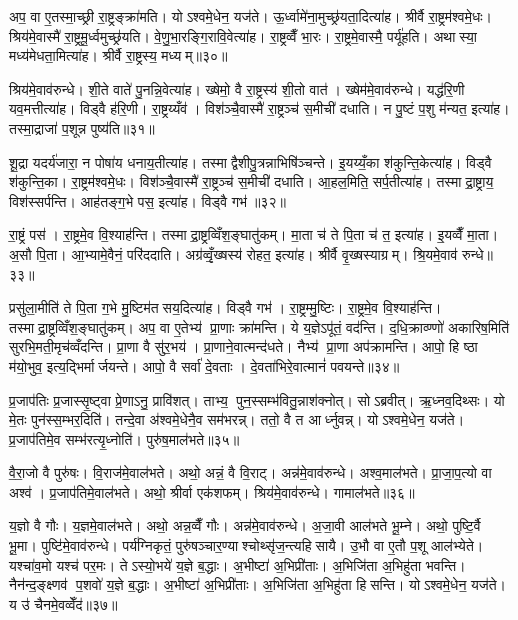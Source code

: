 अप॒ वा ए॒तस्मा॒च्छ्री रा॒ष्ट्रङ्क्रा॑मति। योऽश्वमे॒धेन॒ यज॑ते। ऊ॒र्ध्वामे॑ना॒मुच्छ्र॑यता॒दित्या॑ह। श्रीर्वै रा॒ष्ट्रम॑श्वमे॒धः। श्रिय॑मे॒वास्मै॑ रा॒ष्ट्रमू॒र्ध्वमुच्छ्र॑यति। वे॒णु॒भा॒रङ्गि॒रावि॒वेत्या॑ह। रा॒ष्ट्रव्वैँ भा॒रः। रा॒ष्ट्रमे॒वास्मै॒ पर्यू॑हति। अथास्या॒ मध्य॑मेधता॒मित्या॑ह। श्रीर्वै रा॒ष्ट्रस्य॒ मध्यम्॥३०॥

श्रिय॑मे॒वाव॑रुन्धे। शी॒ते वाते॑ पु॒नन्नि॒वेत्या॑ह। ख्षेमो॒ वै रा॒ष्ट्रस्य॑ शी॒तो वात॑। ख्षेम॑मे॒वाव॑रुन्धे। यद्ध॑रि॒णी यव॒मत्तीत्या॑ह। विड्वै ह॑रि॒णी। रा॒ष्ट्रय्यँव॑। विश॑ञ्चै॒वास्मै॑ रा॒ष्ट्रञ्च॑ स॒मीची॑ दधाति। न पु॒ष्टं प॒शु म॑न्यत॒ इत्या॑ह। तस्मा॒द्राजा॑ प॒शून्न पुष्य॑ति॥३१॥

शू॒द्रा यदर्य॑जारा॒ न पोषा॑य धनाय॒तीत्या॑ह। तस्माद्वैशीपु॒त्रन्नाभिषि॑ञ्चन्ते। इ॒यय्यँ॒का श॑कुन्ति॒केत्या॑ह। विड्वै श॑कुन्ति॒का। रा॒ष्ट्रम॑श्वमे॒धः। विश॑ञ्चै॒वास्मै॑ रा॒ष्ट्रञ्च॑ स॒मीची॑ दधाति। आ॒हल॒मिति॒ सर्प॒तीत्या॑ह। तस्माद्रा॒ष्ट्राय॒ विश॑स्सर्पन्ति। आह॑तङ्ग॒भे पस॒ इत्या॑ह। विड्वै गभ॑॥३२॥

रा॒ष्ट्रं पस॑। रा॒ष्ट्रमे॒व वि॒श्याह॑न्ति। तस्माद्रा॒ष्ट्रव्विँश॒ङ्घातु॑कम्। मा॒ता च॑ ते पि॒ता च॑ त॒ इत्या॑ह। इ॒यव्वैँ मा॒ता। अ॒सौ पि॒ता। आ॒भ्यामे॒वैनं॒ परि॑ददाति। अग्र॑व्वृँ॒ख्षस्य॑ रोहत॒ इत्या॑ह। श्रीर्वै वृ॒ख्षस्याग्रम्। श्रि॒यमे॒वाव॑ रुन्धे॥३३॥

प्रसु॑ला॒मीति॑ ते पि॒ता ग॒भे मु॒ष्टिम॑तसय॒दित्या॑ह। विड्वै गभ॑। रा॒ष्ट्रम्मु॒ष्टिः। रा॒ष्ट्रमे॒व वि॒श्याह॑न्ति। तस्माद्रा॒ष्ट्रव्विँश॒ङ्घातु॑कम्। अप॒ वा ए॒तेभ्य॑ प्रा॒णाः क्रा॑मन्ति। ये य॒ज्ञेऽपू॑तं॒ वद॑न्ति। द॒धि॒क्राव्ण्णो॑ अकारिष॒मिति॑ सुरभि॒मती॒मृच॑व्वँदन्ति। प्रा॒णा वै सु॑र॒भय॑। प्रा॒णाने॒वात्मन्द॑धते। नैभ्य॑ प्रा॒णा अप॑क्रामन्ति। आपो॒ हि ष्ठा म॑यो॒भुव॒ इत्य॒द्भिर्मार्जयन्ते। आपो॒ वै सर्वा॑ दे॒वताः। दे॒वता॑भिरे॒वात्मानं॑ पवयन्ते॥३४॥\anuvakamend[रा॒ष्ट्रस्य॒ मध्यं॒ पुष्य॑ति॒ गभो॑ रुन्धे दधते च॒त्वारि॑ च]

प्र॒जाप॑तिः प्र॒जास्सृ॒ष्ट्वा प्रे॒णाऽनु॒ प्रावि॑शत्। ताभ्य॒ पुन॒स्सम्भ॑वितु॒न्नाश॑क्नोत्। सोऽब्रवीत्। ऋ॒ध्नव॒दिथ्सः। यो मे॒तः पुन॑स्स॒म्भर॒दिति॑। तन्दे॒वा अ॑श्वमे॒धेनै॒व सम॑भरन्न्। ततो॒ वै त आर्ध्नुवन्न्। योऽश्वमे॒धेन॒ यज॑ते। प्र॒जाप॑तिमे॒व सम्भ॑रत्यृ॒ध्नोति॑। पुरु॑ष॒माल॑भते॥३५॥

वै॒रा॒जो वै पुरु॑षः। वि॒राज॑मे॒वाल॑भते। अथो॒ अन्नं॒ वै वि॒राट्। अन्न॑मे॒वाव॑रुन्धे। अश्व॒माल॑भते। प्रा॒जा॒प॒त्यो वा अश्व॑। प्र॒जाप॑तिमे॒वाल॑भते। अथो॒ श्रीर्वा एक॑शफम्। श्रिय॑मे॒वाव॑रुन्धे। गामाल॑भते॥३६॥

य॒ज्ञो वै गौः। य॒ज्ञमे॒वाल॑भते। अथो॒ अन्न॒व्वैँ गौः। अन्न॑मे॒वाव॑रुन्धे। अ॒जा॒वी आल॑भते भू॒म्ने। अथो॒ पुष्टि॒र्वै भू॒मा। पुष्टि॑मे॒वाव॑रुन्धे। पर्य॑ग्निकृतं॒ पुरु॑षञ्चार॒ण्याश्चोथ्सृ॑ज॒न्त्यहिसायै। उ॒भौ वा ए॒तौ प॒शू आल॑भ्येते। यश्चा॑व॒मो यश्च॑ पर॒मः। तेऽस्यो॒भये॑ य॒ज्ञे ब॒द्धाः। अ॒भीष्टा॑ अ॒भिप्री॑ताः। अ॒भिजि॑ता अ॒भिहु॑ता भवन्ति। नैन॑न्द॒ङ्क्ष्णव॑ प॒शवो॑ य॒ज्ञे ब॒द्धाः। अ॒भीष्टा॑ अ॒भिप्री॑ताः। अ॒भिजि॑ता अ॒भिहु॑ता हिसन्ति। योऽश्वमे॒धेन॒ यज॑ते। य उ॑ चैनमे॒वव्वेँद॑॥३७॥\anuvakamend[ल॒भ॒ते॒ गामाल॑भते पर॒मोऽष्टौ च॑]

